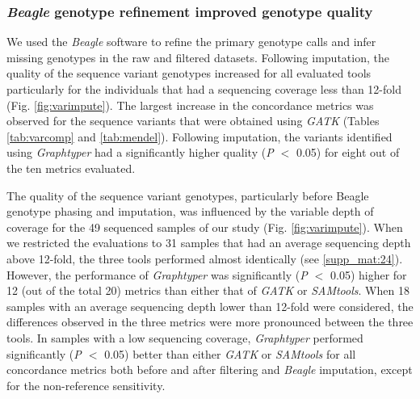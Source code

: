 \documentclass[../main.tex]{subfiles}
\begin{document}
\subsubsection*{\emph{Beagle} genotype refinement improved genotype quality}

We used the \emph{Beagle} software to refine the primary genotype calls and infer missing genotypes in the raw and filtered datasets. 
Following imputation, the quality of the sequence variant genotypes increased for all evaluated tools particularly for the individuals that had a sequencing coverage less than 12-fold (Fig. \ref{fig:varimpute}). 
The largest increase in the concordance metrics was observed for the sequence variants that were obtained using \emph{GATK} (Tables \ref{tab:varcomp} and \ref{tab:mendel}). 
Following imputation, the variants identified using \emph{Graphtyper} had a significantly higher quality (\emph{P $<$} 0.05) for eight out of the ten metrics evaluated.

The quality of the sequence variant genotypes, particularly before Beagle genotype phasing and imputation, was influenced by the variable depth of coverage for the 49 sequenced samples of our study (Fig. \ref{fig:varimpute}). 
When we restricted the evaluations to 31 samples that had an average sequencing depth above 12-fold, the three tools performed almost identically (see \ref{supp_mat:24}). 
However, the performance of \emph{Graphtyper} was significantly (\emph{P $<$} 0.05) higher for 12 (out of the total 20) metrics than either that of \emph{GATK} or \emph{SAMtools}. 
When 18 samples with an average sequencing depth lower than 12-fold were considered, the differences observed in the three metrics were more pronounced between the three tools. 
In samples with a low sequencing coverage, \emph{Graphtyper} performed significantly (\emph{P $<$} 0.05) better than either \emph{GATK} or \emph{SAMtools} for all concordance metrics both before and after filtering and \emph{Beagle} imputation, except for the non-reference sensitivity.
\end{document}
